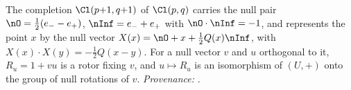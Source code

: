 The completion $\Cl(p{+}1,q{+}1)$ of $\Cl(p,q)$ carries the null pair $\nO = \tfrac12(e_{-} - e_{+})$, $\nInf = e_{-} + e_{+}$ with $\nO \cdot \nInf = -1$, and represents the point $x$ by the null vector $X(x) = \nO + x + \tfrac12 Q(x)\nInf$, with $X(x)\cdot X(y) = -\tfrac12 Q(x - y)$. For a null vector $v$ and $u$ orthogonal to it, $R_{u} = 1 + vu$ is a rotor fixing $v$, and $u \mapsto R_{u}$ is an isomorphism of $(U, +)$ onto the group of null rotations of $v$. \emph{Provenance:} \cite[Sec.~4.3, Lem.~4.6, Thm.~4.10]{ButlerT1}.

